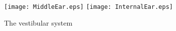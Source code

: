 \documentclass[../main.tex]{subfiles}
\begin{document}
        \begin{figure}[htb]
          \centering
          \texttt{[image: MiddleEar.eps]}
          \texttt{[image: InternalEar.eps]}
          \caption[The vestibular system]{The vestibular system~\cite{BlausenLimbic}}
        \end{figure}
\end{document}

